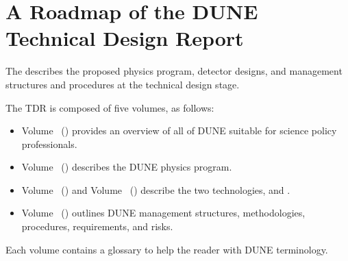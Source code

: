 \cleardoublepage
\section*{A Roadmap of the DUNE Technical Design Report}

The   describes the proposed physics program,  
detector designs, and management structures and procedures at the technical design stage.  

The TDR is composed of five volumes, as follows:

\begin{itemize}
\item Volume~\volnumberexec{} (\voltitleexec{}) provides an overview of all of DUNE suitable for science policy professionals.

\item Volume~\volnumberphysics{} (\voltitlephysics{}) describes the DUNE physics program.

\item Volume~\volnumbersp{} (\voltitlesp{}) and Volume~\volnumberdp{} (\voltitledp{}) describe the two   technologies,  and .


\item Volume~\volnumbertc{} (\voltitletc{}) outlines DUNE management structures, methodologies, procedures, requirements, and risks. 
\end{itemize}

Each volume contains a glossary to help the reader with DUNE terminology.

\cleardoublepage



